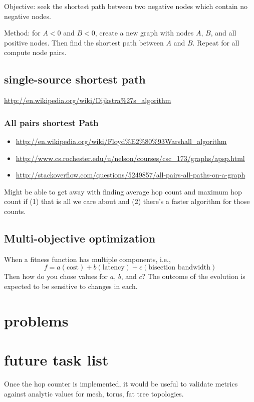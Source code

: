 \documentclass[pdftex]{article}
\begin{document}
Objective: seek the shortest path between two negative nodes which contain no negative nodes.

Method: for $A<0$ and $B<0$, create a new graph with nodes $A$, $B$, and all positive nodes. Then find the shortest path between $A$ and $B$. Repeat for all compute node pairs.

\subsection{single-source shortest path}

\href{http://en.wikipedia.org/wiki/Dijkstra\%27s_algorithm}{http://en.wikipedia.org/wiki/Dijkstra\%27s\_algorithm}

\subsubsection{All pairs shortest Path}

\begin{itemize}
 \item \href{http://en.wikipedia.org/wiki/Floyd\%E2\%80\%93Warshall_algorithm}{http://en.wikipedia.org/wiki/Floyd\%E2\%80\%93Warshall\_algorithm}
 \item \href{http://www.cs.rochester.edu/u/nelson/courses/csc_173/graphs/apsp.html}{http://www.cs.rochester.edu/u/nelson/courses/csc\_173/graphs/apsp.html}
 \item \href{http://stackoverflow.com/questions/5249857/all-pairs-all-paths-on-a-graph}{http://stackoverflow.com/questions/5249857/all-pairs-all-paths-on-a-graph}
\end{itemize}
Might be able to get away with finding average hop count and maximum hop count if (1) that is all we care about and (2) there's a faster algorithm for those counts.


\subsection{Multi-objective optimization}
 
When a fitness function has multiple components, i.e.,
\begin{equation}
 f=a(\textrm{cost})+b(\textrm{latency})+c(\textrm{bisection\ bandwidth})
\end{equation}
Then how do you chose values for $a$, $b$, and $c$? The outcome of the evolution is expected to be sensitive to changes in each.
 
\section{problems}
 
\section{future task list}

Once the hop counter is implemented, it would be useful to validate metrics against analytic values for mesh, torus, fat tree topologies.
\end{document}
